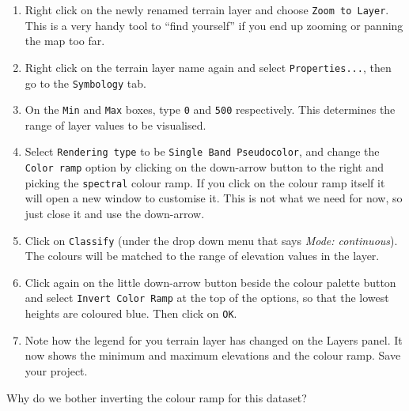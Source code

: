 \documentclass[
  letterpaper,
  DIV=11,
  numbers=noendperiod]{scrreprt}
\begin{document}
\begin{enumerate}
\def\labelenumi{(\arabic{enumi})}
\setcounter{enumi}{20}
\item
  Right click on the newly renamed terrain layer and choose
  \texttt{Zoom\ to\ Layer}. This is a very handy tool to ``find
  yourself'' if you end up zooming or panning the map too far.
\item
  Right click on the terrain layer name again and select
  \texttt{Properties...}, then go to the \texttt{Symbology} tab.
\item
  On the \texttt{Min} and \texttt{Max} boxes, type \texttt{0} and
  \texttt{500} respectively. This determines the range of layer values
  to be visualised.
\item
  Select \texttt{Rendering\ type} to be
  \texttt{Single\ Band\ Pseudocolor}, and change the
  \texttt{Color\ ramp} option by clicking on the down-arrow button to
  the right and picking the \texttt{spectral} colour ramp. If you click
  on the colour ramp itself it will open a new window to customise it.
  This is not what we need for now, so just close it and use the
  down-arrow.
\item
  Click on \texttt{Classify} (under the drop down menu that says
  \emph{Mode: continuous}). The colours will be matched to the range of
  elevation values in the layer.
\item
  Click again on the little down-arrow button beside the colour palette
  button and select \texttt{Invert\ Color\ Ramp} at the top of the
  options, so that the lowest heights are coloured blue. Then click on
  \texttt{OK}.
\item
  Note how the legend for you terrain layer has changed on the Layers
  panel. It now shows the minimum and maximum elevations and the colour
  ramp. Save your project.
\end{enumerate}

\begin{tcolorbox}[enhanced jigsaw, breakable, toptitle=1mm, colback=white, left=2mm, leftrule=.75mm, titlerule=0mm, colframe=quarto-callout-important-color-frame, opacityback=0, title=\textcolor{quarto-callout-important-color}{\faExclamation}\hspace{0.5em}{Stop and Think}, toprule=.15mm, opacitybacktitle=0.6, bottomtitle=1mm, colbacktitle=quarto-callout-important-color!10!white, bottomrule=.15mm, coltitle=black, rightrule=.15mm, arc=.35mm]

Why do we bother inverting the colour ramp for this dataset?

\end{tcolorbox}
\end{document}
